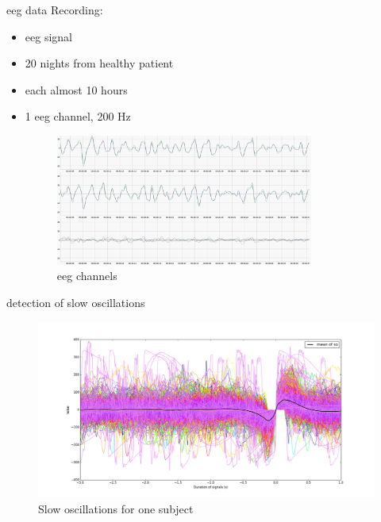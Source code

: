 \documentclass[10pt]{beamer}
\begin{document}
  \begin{frame}{eeg data}
Recording:
\begin{itemize}
\item eeg signal
\item 20 nights from healthy patient
\item each almost 10 hours
\item 1 eeg channel, 200 Hz
\begin{figure}[htbp]
\centering
\includegraphics[width=0.8\textwidth]{eeg.png}
\caption{eeg channels}
\label{default}
\end{figure}
\end{itemize}
\end{frame}

\begin{frame}{detection of slow oscillations}
\begin{figure}[htbp]
\centering
\includegraphics[width=1.0\textwidth]{so_sub1.png}
\caption{Slow oscillations for one subject}
\label{default}
\end{figure}
\end{frame}
\end{document}

